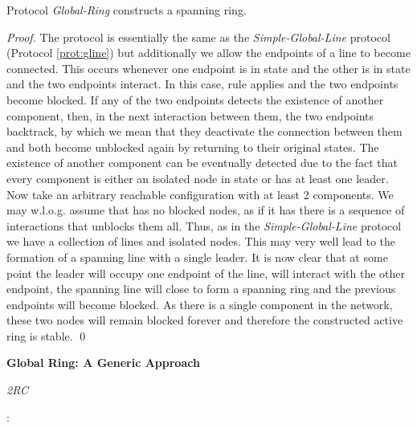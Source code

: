 \documentclass[oribibl, 11pt]{llncs}
\begin{document}
\begin{theorem}
Protocol \emph{Global-Ring} constructs a spanning ring.
\end{theorem}
\begin{proof}
The protocol is essentially the same as the \emph{Simple-Global-Line} protocol (Protocol \ref{prot:gline}) but additionally we allow the endpoints of a line to become connected. This occurs whenever one endpoint is in state  and the other is in state  and the two endpoints interact. In this case, rule  applies and the two endpoints become blocked. If any of the two endpoints detects the existence of another component, then, in the next interaction between them, the two endpoints backtrack, by which we mean that they deactivate the connection between them and both become unblocked again by returning to their original states. The existence of another component can be eventually detected due to the fact that every component is either an isolated node in state  or has at least one leader. Now take an arbitrary reachable configuration  with at least 2 components. We may w.l.o.g. assume that  has no blocked nodes, as if it has there is a sequence of interactions that unblocks them all. Thus, as in the \emph{Simple-Global-Line} protocol we have a collection of lines and isolated nodes. This may very well lead to the formation of a spanning line with a single leader. It is now clear that at some point the leader will occupy one endpoint of the line, will interact with the other endpoint, the spanning line will close to form a spanning ring and the previous endpoints will become blocked. As there is a single component in the network, these two nodes will remain blocked forever and therefore the constructed active ring is stable. 
\qed
\end{proof}

\noindent\textbf{Global Ring: A Generic Approach}

\renewcommand{\algorithmiccomment}[1]{// #1}
\begin{algorithm}[!h]
  \caption{\emph{2RC}}\label{prot:2rc}
  \begin{algorithmic}
    \medskip
    \State 
    \State : 
     
  \end{algorithmic}
\end{algorithm}
\end{document}
